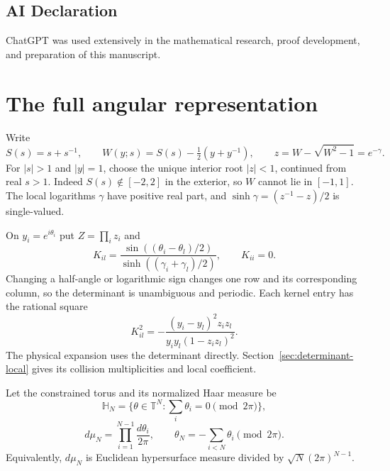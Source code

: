 \documentclass[11pt]{article}
\numberwithin{equation}{section}
\theoremstyle{remark}\newtheorem{remark}[theorem]{Remark}
\begin{document}
\subsection*{AI Declaration}
ChatGPT was used extensively in the mathematical research, proof development,
and preparation of this manuscript.

\section{The full angular representation}
\label{sec:representation}\label{sec:angular-bulk}

Write
\[
 S(s)=s+s^{-1},\qquad
 W(y;s)=S(s)-\tfrac12(y+y^{-1}),\qquad
 z=W-\sqrt{W^2-1}=e^{-\gamma}.
\]
For $|s|>1$ and $|y|=1$, choose the unique interior root $|z|<1$,
continued from real $s>1$. Indeed $S(s)\notin[-2,2]$ in the
exterior, so $W$ cannot lie in $[-1,1]$. The local logarithms
$\gamma$ have positive real part, and
$\sinh\gamma=(z^{-1}-z)/2$ is single-valued.

On $y_i=e^{i\theta_i}$ put $Z=\prod_i z_i$ and
\begin{equation}\label{eq:angular-kernel}
 K_{il}=\frac{\sin((\theta_i-\theta_l)/2)}
                  {\sinh((\gamma_i+\gamma_l)/2)},
 \qquad K_{ii}=0.
\end{equation}
Changing a half-angle or logarithmic sign changes one row and its
corresponding column, so the determinant is unambiguous and periodic.
Each kernel entry has the rational square
\begin{equation}\label{eq:kernel-square}
 K_{il}^2=-\frac{(y_i-y_l)^2z_i z_l}
                    {y_i y_l(1-z_i z_l)^2}.
\end{equation}
The physical expansion uses the determinant directly.
Section~\ref{sec:determinant-local} gives its collision
multiplicities and local coefficient.

Let the constrained torus and its normalized Haar measure be
\[
 \mathbb H_N=\{\theta\in\mathbb T^N:
                      \textstyle\sum_i\theta_i=0\pmod{2\pi}\},
\]
\[
 d\mu_N=\prod_{i=1}^{N-1}\frac{d\theta_i}{2\pi},
 \qquad \theta_N=-\sum_{i<N}\theta_i\pmod{2\pi}.
\]
Equivalently, $d\mu_N$ is Euclidean hypersurface measure divided
by $\sqrt N(2\pi)^{N-1}$.
\end{document}
